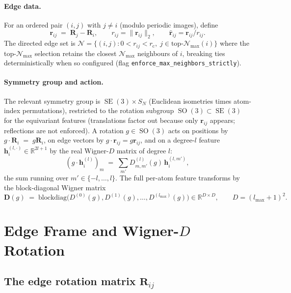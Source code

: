 \documentclass[11pt,a4paper]{article}
\DeclareMathOperator{\SO}{SO}
\DeclareMathOperator{\SE}{SE}
\newcommand{\R}{\mathbb{R}}
\newcommand{\bR}{\bm{R}}
\newcommand{\br}{\bm{r}}
\newcommand{\brh}{\hat{\bm{r}}}
\newcommand{\bh}{\bm{h}}
\newcommand{\bD}{\bm{D}}
\newcommand{\rcut}{r_{\mathrm{c}}}
\newcommand{\lmax}{l_{\max}}
\newcommand{\Nb}{\mathcal{N}}
\theoremstyle{plain}
\theoremstyle{definition}
\theoremstyle{remark}
\begin{document}
\paragraph{Edge data.}
For an ordered pair $(i,j)$ with $j\ne i$ (modulo periodic images), define
\begin{equation}\label{eq:edgevec}
    \br_{ij}\;=\;\bR_j-\bR_i,\qquad r_{ij}=\|\br_{ij}\|_2,\qquad \brh_{ij}=\br_{ij}/r_{ij}.
\end{equation}
The directed edge set is $\Nb=\{(i,j):0<r_{ij}<\rcut,\;j\in\text{top-}\Nb_{\max}(i)\}$ where the top-$\Nb_{\max}$ selection retains the closest $\Nb_{\max}$ neighbours of $i$, breaking ties deterministically when so configured (flag \texttt{enforce\_max\_neighbors\_strictly}).

\paragraph{Symmetry group and action.}
The relevant symmetry group is $\SE(3)\times S_N$ (Euclidean isometries times
atom-index permutations), restricted to the rotation subgroup
$\SO(3)\subset\SE(3)$ for the equivariant features (translations factor out
because only $\br_{ij}$ appears; reflections are not enforced). A rotation
$g\in\SO(3)$ acts on positions by $g\cdot\bR_i\;=\;g\bR_i$, on edge vectors by
$g\cdot\br_{ij}=g\br_{ij}$, and on a degree-$l$ feature
$\bh^{(l,\cdot)}_i\in\R^{2l+1}$ by the real Wigner-$D$ matrix of degree $l$:
\begin{equation}\label{eq:wignerD-action}
    (g\cdot\bh^{(l)}_i)_m \;=\;\sum_{m'} D^{(l)}_{m,m'}(g)\,\bh^{(l,m')}_i,
\end{equation}
the sum running over $m'\in\{-l,\dots,l\}$.
The full per-atom feature transforms by the block-diagonal Wigner matrix
\begin{equation}\label{eq:Dgblock}
    \bD(g)\;=\;\mathrm{blockdiag}\bigl(D^{(0)}(g),D^{(1)}(g),\dots,D^{(\lmax)}(g)\bigr)\in\R^{D\times D},\qquad D=(\lmax+1)^2.
\end{equation}

\section{Edge Frame and Wigner-$D$ Rotation}\label{sec:so3rot}

\subsection{\texorpdfstring{The edge rotation matrix $\bR_{ij}$}{The edge rotation matrix R\_ij}}\label{sec:edgerot}
\end{document}
